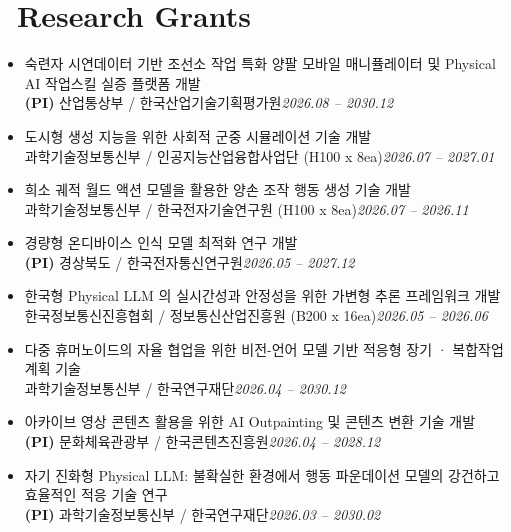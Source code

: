 \documentclass[a4paper,11pt]{article}
\begin{document}
\section{\texorpdfstring{\faFlask\ Research Grants}{Research Grants}}
\begin{itemize}[leftmargin=0.25cm]

    \item 숙련자 시연데이터 기반 조선소 작업 특화 양팔 모바일 매니퓰레이터 및 Physical AI 작업스킬 실증 플랫폼 개발\\
    \textbf{(PI)} 산업통상부 / 한국산업기술기획평가원\hfill \textit{2026.08 -- 2030.12}

    \item 도시형 생성 지능을 위한 사회적 군중 시뮬레이션 기술 개발\\
    과학기술정보통신부 / 인공지능산업융합사업단 (H100 x 8ea)\hfill \textit{2026.07 -- 2027.01}

    \item 희소 궤적 월드 액션 모델을 활용한 양손 조작 행동 생성 기술 개발\\
    과학기술정보통신부 / 한국전자기술연구원 (H100 x 8ea)\hfill \textit{2026.07 -- 2026.11}

    \item 경량형 온디바이스 인식 모델 최적화 연구 개발\\
    \textbf{(PI)} 경상북도 / 한국전자통신연구원\hfill \textit{2026.05 -- 2027.12}

    \item 한국형 Physical LLM 의 실시간성과 안정성을 위한 가변형 추론 프레임워크 개발\\
    한국정보통신진흥협회 / 정보통신산업진흥원 (B200 x 16ea)\hfill \textit{2026.05 -- 2026.06}

    \item 다중 휴머노이드의 자율 협업을 위한 비전-언어 모델 기반 적응형 장기 · 복합작업 계획 기술\\
    과학기술정보통신부 / 한국연구재단\hfill \textit{2026.04 -- 2030.12}

    \item 아카이브 영상 콘텐츠 활용을 위한 AI Outpainting 및 콘텐츠 변환 기술 개발\\
    \textbf{(PI)} 문화체육관광부 / 한국콘텐츠진흥원\hfill \textit{2026.04 -- 2028.12}

    \item 자기 진화형 Physical LLM: 불확실한 환경에서 행동 파운데이션 모델의 강건하고 효율적인 적응 기술 연구\\
    \textbf{(PI)} 과학기술정보통신부 / 한국연구재단\hfill \textit{2026.03 -- 2030.02}


\end{itemize}
\end{document}
